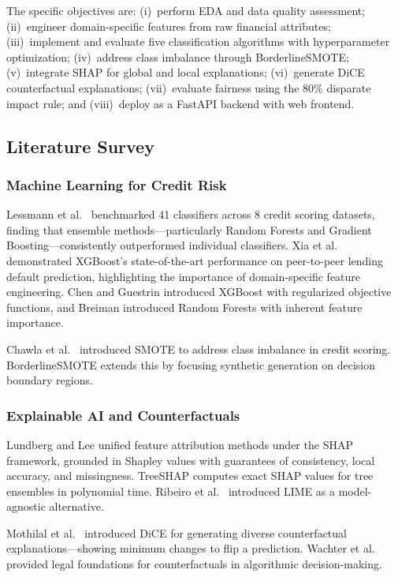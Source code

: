 \documentclass[journal]{IEEEtran}
\begin{document}
The specific objectives are: (i)~perform EDA and data quality assessment; (ii)~engineer domain-specific features from raw financial attributes; (iii)~implement and evaluate five classification algorithms with hyperparameter optimization; (iv)~address class imbalance through BorderlineSMOTE; (v)~integrate SHAP for global and local explanations; (vi)~generate DiCE counterfactual explanations; (vii)~evaluate fairness using the 80\% disparate impact rule; and (viii)~deploy as a FastAPI backend with web frontend.


\subsection{Literature Survey}

\subsubsection{Machine Learning for Credit Risk}
Lessmann et al.\ \cite{lessmann2015} benchmarked 41 classifiers across 8 credit scoring datasets, finding that ensemble methods---particularly Random Forests and Gradient Boosting---consistently outperformed individual classifiers. Xia et al.\ \cite{xia2017} demonstrated XGBoost's state-of-the-art performance on peer-to-peer lending default prediction, highlighting the importance of domain-specific feature engineering. Chen and Guestrin \cite{chen2016} introduced XGBoost with regularized objective functions, and Breiman \cite{breiman2001} introduced Random Forests with inherent feature importance.

Chawla et al.\ \cite{chawla2002} introduced SMOTE to address class imbalance in credit scoring. BorderlineSMOTE \cite{han2005} extends this by focusing synthetic generation on decision boundary regions.

\subsubsection{Explainable AI and Counterfactuals}
Lundberg and Lee \cite{lundberg2017} unified feature attribution methods under the SHAP framework, grounded in Shapley values with guarantees of consistency, local accuracy, and missingness. TreeSHAP \cite{lundberg2020} computes exact SHAP values for tree ensembles in polynomial time. Ribeiro et al.\ \cite{ribeiro2016} introduced LIME as a model-agnostic alternative.

Mothilal et al.\ \cite{mothilal2020} introduced DiCE for generating diverse counterfactual explanations---showing minimum changes to flip a prediction. Wachter et al.\ \cite{wachter2018} provided legal foundations for counterfactuals in algorithmic decision-making.
\end{document}
